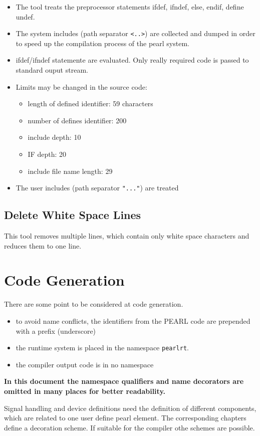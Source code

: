 \begin{itemize}
\item The tool treats the preprocessor statements 
ifdef, ifndef, else, endif, define undef.
\item The system includes (path separator \verb|<..>|) are collected
and dumped in order to speed up the compilation process of the 
pearl system.
\item ifdef/ifndef statemente are evaluated. Only really required code
   is passed to standard ouput stream.
\item Limits may be changed in the source code: 
   \begin{itemize}
   \item length of defined identifier: 59 characters
   \item number of defines identifier: 200
   \item include depth: 10
   \item IF depth: 20
   \item include file name length: 29
   \end{itemize}
\item The user includes (path separator \verb|"..."|) are treated
\end{itemize}
 

\subsection{Delete White Space Lines}
This tool removes multiple lines, which contain only white space characters
and reduces them to one line.

\section{Code Generation}
There are some point to be considered at code generation.
\begin{itemize}
\item to avoid name conflicts, the identifiers from the PEARL code
   are prepended with a prefix  (underscore)
\item the runtime system is placed in the namespace \verb|pearlrt|.
\item the compiler output code is in no namespace
\end{itemize}

{\bf 
In this document the namespace qualifiers  and name decorators 
are omitted in many places for better readability.
}

Signal handling and device definitions need the definition of 
different components, which are related to one user define pearl 
element.
The corresponding chapters define a decoration scheme. If suitable
for the compiler othe schemes are possible. 



